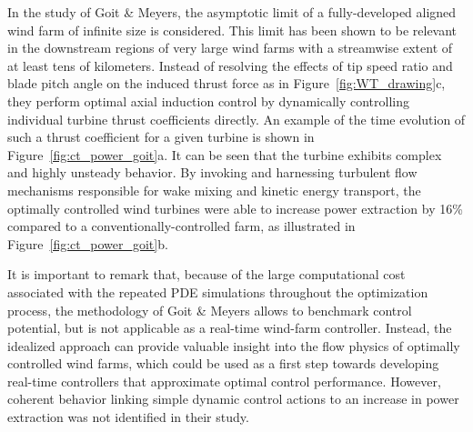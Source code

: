In the study of Goit \& Meyers, the asymptotic limit of a fully-developed aligned wind farm of infinite size is considered. This limit has been shown to be relevant in the downstream regions of very large wind farms with a streamwise extent of at least tens of kilometers. Instead of resolving the effects of tip speed ratio and blade pitch angle on the induced thrust force as in Figure~\ref{fig:WT_drawing}c, they perform optimal axial induction control by dynamically controlling individual turbine thrust coefficients directly. An example of the time evolution of such a thrust coefficient for a given turbine is shown in Figure~\ref{fig:ct_power_goit}a. It can be seen that the turbine exhibits complex and highly unsteady behavior. By invoking and harnessing turbulent flow mechanisms responsible for wake mixing and kinetic energy transport, the optimally controlled wind turbines were able to increase power extraction by 16\% compared to a conventionally-controlled farm, as illustrated in Figure~\ref{fig:ct_power_goit}b. 

It is important to remark that, because of the large computational cost associated with the repeated PDE simulations throughout the optimization process, the methodology of Goit \& Meyers allows to benchmark control potential, but is not applicable as a real-time wind-farm controller. Instead, the idealized approach can provide valuable insight into the flow physics of optimally controlled wind farms, which could be used as a first step towards developing real-time controllers that approximate optimal control performance. However, coherent behavior linking simple dynamic control actions to an increase in power extraction was not identified in their study. 


